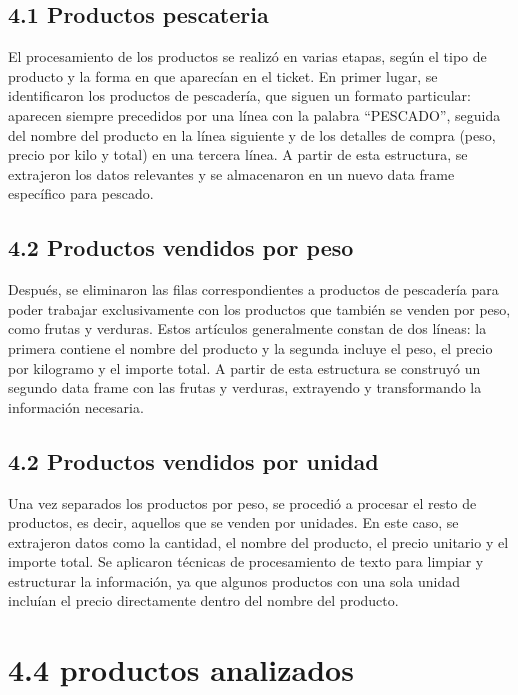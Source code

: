 \documentclass[,,,oneauthor,pdftex]{Definitions/mdpi}
\begin{document}
\hypertarget{productos-pescateria}{%
\subsection{4.1 Productos pescateria}\label{productos-pescateria}}

El procesamiento de los productos se realizó en varias etapas, según el
tipo de producto y la forma en que aparecían en el ticket. En primer
lugar, se identificaron los productos de pescadería, que siguen un
formato particular: aparecen siempre precedidos por una línea con la
palabra ``PESCADO'', seguida del nombre del producto en la línea
siguiente y de los detalles de compra (peso, precio por kilo y total) en
una tercera línea. A partir de esta estructura, se extrajeron los datos
relevantes y se almacenaron en un nuevo data frame específico para
pescado.

\hypertarget{productos-vendidos-por-peso}{%
\subsection{4.2 Productos vendidos por
peso}\label{productos-vendidos-por-peso}}

Después, se eliminaron las filas correspondientes a productos de
pescadería para poder trabajar exclusivamente con los productos que
también se venden por peso, como frutas y verduras. Estos artículos
generalmente constan de dos líneas: la primera contiene el nombre del
producto y la segunda incluye el peso, el precio por kilogramo y el
importe total. A partir de esta estructura se construyó un segundo data
frame con las frutas y verduras, extrayendo y transformando la
información necesaria.

\hypertarget{productos-vendidos-por-unidad}{%
\subsection{4.2 Productos vendidos por
unidad}\label{productos-vendidos-por-unidad}}

Una vez separados los productos por peso, se procedió a procesar el
resto de productos, es decir, aquellos que se venden por unidades. En
este caso, se extrajeron datos como la cantidad, el nombre del producto,
el precio unitario y el importe total. Se aplicaron técnicas de
procesamiento de texto para limpiar y estructurar la información, ya que
algunos productos con una sola unidad incluían el precio directamente
dentro del nombre del producto.

\hypertarget{productos-analizados}{%
\section{4.4 productos analizados}\label{productos-analizados}}
\end{document}
